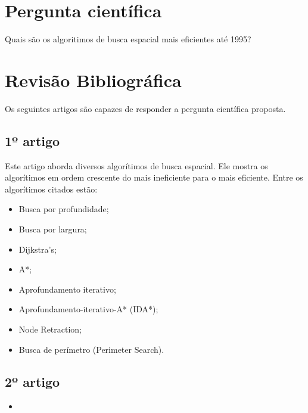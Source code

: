 \documentclass[a4paper]{article}
\begin{document}

\section{Pergunta científica}

Quais são os algoritimos de busca espacial mais eficientes até 1995?


\section{Revisão Bibliográfica}
Os seguintes artigos são capazes de responder a pergunta científica proposta.
\vspace{3mm}

\subsection{1º artigo}

Este artigo \cite{Korf1995} aborda diversos algorítimos de busca espacial. Ele mostra os algorítimos em ordem crescente do mais ineficiente para o mais eficiente. Entre os algorítimos citados estão:

\begin{itemize}

\item Busca por profundidade;
\item Busca por largura;
\item Dijkstra's;
\item A*;
\item Aprofundamento iterativo;
\item Aprofundamento-iterativo-A* (IDA*);
\item Node Retraction;
\item Busca de perímetro (Perimeter Search).

\end{itemize}

\subsection{2º artigo}

\cite{Chakrabarti1989}

\begin{itemize}

\item

\end{itemize}
\end{document}
